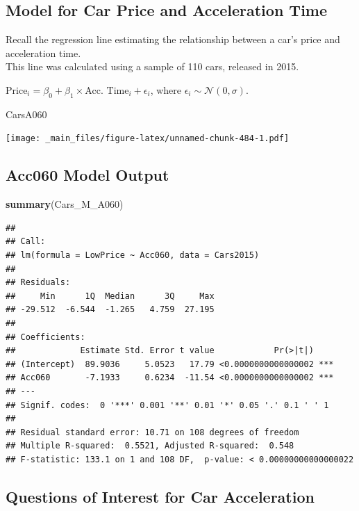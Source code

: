 \documentclass[]{book}
\newenvironment{Shaded}{\begin{snugshade}}{\end{snugshade}}
\newcommand{\KeywordTok}[1]{\textcolor[rgb]{0.13,0.29,0.53}{\textbf{#1}}}
\newcommand{\NormalTok}[1]{#1}
\begin{document}
\subsection{Model for Car Price and Acceleration
Time}\label{model-for-car-price-and-acceleration-time}

Recall the regression line estimating the relationship between a car's
price and acceleration time.\\
This line was calculated using a sample of 110 cars, released in 2015.

\(\text{Price}_i = \beta_0 + \beta_1\times\text{Acc. Time}_i + \epsilon_i\),
where \(\epsilon_i\sim\mathcal{N}(0, \sigma)\).

\begin{Shaded}
\begin{Highlighting}[]
\NormalTok{CarsA060}
\end{Highlighting}
\end{Shaded}

\texttt{[image: \_main\_files/figure-latex/unnamed-chunk-484-1.pdf]}

\subsection{Acc060 Model Output}\label{acc060-model-output}

\begin{Shaded}
\begin{Highlighting}[]
\KeywordTok{summary}\NormalTok{(Cars_M_A060)}
\end{Highlighting}
\end{Shaded}

\begin{verbatim}
## 
## Call:
## lm(formula = LowPrice ~ Acc060, data = Cars2015)
## 
## Residuals:
##     Min      1Q  Median      3Q     Max 
## -29.512  -6.544  -1.265   4.759  27.195 
## 
## Coefficients:
##             Estimate Std. Error t value            Pr(>|t|)    
## (Intercept)  89.9036     5.0523   17.79 <0.0000000000000002 ***
## Acc060       -7.1933     0.6234  -11.54 <0.0000000000000002 ***
## ---
## Signif. codes:  0 '***' 0.001 '**' 0.01 '*' 0.05 '.' 0.1 ' ' 1
## 
## Residual standard error: 10.71 on 108 degrees of freedom
## Multiple R-squared:  0.5521, Adjusted R-squared:  0.548 
## F-statistic: 133.1 on 1 and 108 DF,  p-value: < 0.00000000000000022
\end{verbatim}

\subsection{Questions of Interest for Car
Acceleration}\label{questions-of-interest-for-car-acceleration}
\end{document}
